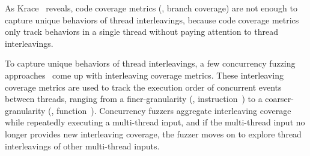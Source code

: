 



%
As Krace~\cite{krace} reveals, code coverage metrics (\eg, branch
coverage) are not enough to capture unique behaviors of thread
interleavings, because code coverage metrics only track behaviors in a
single thread without paying attention to thread interleavings.


To capture unique behaviors of thread interleavings, a few concurrency
fuzzing approaches~\cite{conzzer, krace} come up with interleaving
coverage metrics.
%
These interleaving coverage metrics are used to track the execution
order of concurrent events between threads, ranging from a
finer-granularity (\eg, instruction~\cite{krace}) to a
coarser-granularity (\eg, function~\cite{conzzer}).
%
Concurrency fuzzers aggregate interleaving coverage while repeatedly
executing a multi-thread input, and if the multi-thread input no
longer provides new interleaving coverage, the fuzzer moves on to
explore thread interleavings of other multi-thread inputs.


%

